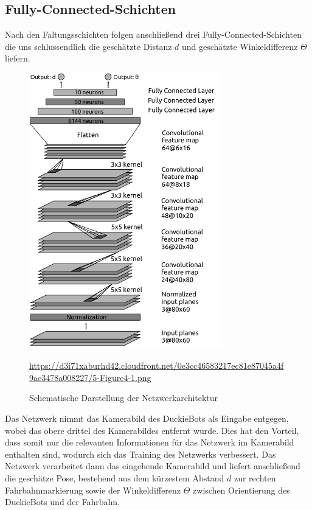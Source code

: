\subsection{Fully-Connected-Schichten}

Nach den Faltungsschichten folgen anschließend drei Fully-Connected-Schichten die uns schlussendlich die geschätzte Distanz $d$ und geschätzte Winkeldifferenz $\Theta$ liefern.
\vspace{0.6cm}
\begin{figure}[H]
	\centering
	\includegraphics[width=0.75\textwidth]{kapitel4/images/network_architecture.png}
	\caption{Schematische Darstellung der Netzwerkarchitektur}
	\label{network-architecture}
	\vspace{0.2cm}
	\quelle\url{https://d3i71xaburhd42.cloudfront.net/0e3cc46583217ec81e87045a4f9ae3478a008227/5-Figure4-1.png}
\end{figure}

Das Netzwerk nimmt das  Kamerabild des DuckieBots als Eingabe entgegen, wobei das obere drittel des Kamerabildes entfernt wurde. Dies hat den Vorteil, dass somit nur die relevanten Informationen für das Netzwerk im Kamerabild enthalten sind, wodurch sich das Training des Netzwerks verbessert. Das Netzwerk verarbeitet dann das eingehende Kamerabild und liefert anschließend die geschätze Pose, bestehend aus dem kürzestem Abstand $d$ zur rechten Fahrbahnmarkierung sowie der Winkeldifferenz $\Theta$ zwischen Orientierung des DuckieBots und der Fahrbahn.


